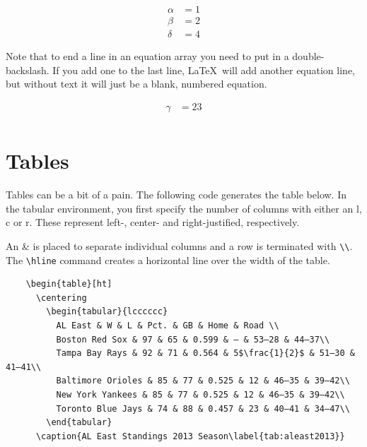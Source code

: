 \documentclass[12pt,a4paper]{article}
\begin{document}
  \begin{align}
    \alpha &= 1 \\
    \beta &= 2 \\ 
    \delta &= 4 
  \end{align}

  Note that to end a line in an equation array you need to put in a
  double-backslash.  If you add one to the last line, \LaTeX\ will add
  another equation line, but without text it will just be a blank,
  numbered equation.  

  \begin{align}
    \gamma &= 23 \\
  \end{align}

  \section{Tables}
    Tables can be a bit of a pain. The following code generates the
    table below.  In the tabular environment, you first specify the
    number of columns with either an l, c or r.  These represent left-,
    center- and right-justified, respectively.  

    An \& is placed to separate individual columns and a row is
    terminated with \verb|\\|.  The \verb|\hline| command creates a
    horizontal line over the width of the table.  
    \begin{verbatim}
    \begin{table}[ht]
      \centering
        \begin{tabular}{lcccccc}
          AL East & W & L & Pct. & GB & Home & Road \\
          Boston Red Sox & 97 & 65 & 0.599 & — & 53–28 & 44–37\\
          Tampa Bay Rays & 92 & 71 & 0.564 & 5$\frac{1}{2}$ & 51–30 & 41–41\\
          Baltimore Orioles & 85 & 77 & 0.525 & 12 & 46–35 & 39–42\\
          New York Yankees & 85 & 77 & 0.525 & 12 & 46–35 & 39–42\\
          Toronto Blue Jays & 74 & 88 & 0.457 & 23 & 40–41 & 34–47\\
        \end{tabular}
      \caption{AL East Standings 2013 Season\label{tab:aleast2013}}
    \end{verbatim}

    \vspace{2cm}
\end{document}
